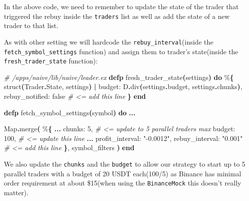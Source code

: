 \documentclass[
  oneside]{book}
\newenvironment{Shaded}{\begin{snugshade}}{\end{snugshade}}
\newcommand{\CommentTok}[1]{\textcolor[rgb]{0.56,0.35,0.01}{\textit{#1}}}
\newcommand{\ConstantTok}[1]{\textcolor[rgb]{0.56,0.35,0.01}{#1}}
\newcommand{\DecValTok}[1]{\textcolor[rgb]{0.00,0.00,0.81}{#1}}
\newcommand{\FunctionTok}[1]{\textcolor[rgb]{0.13,0.29,0.53}{\textbf{#1}}}
\newcommand{\KeywordTok}[1]{\textcolor[rgb]{0.13,0.29,0.53}{\textbf{#1}}}
\newcommand{\NormalTok}[1]{#1}
\newcommand{\OperatorTok}[1]{\textcolor[rgb]{0.81,0.36,0.00}{\textbf{#1}}}
\newcommand{\StringTok}[1]{\textcolor[rgb]{0.31,0.60,0.02}{#1}}
\newcommand{\VariableTok}[1]{\textcolor[rgb]{0.00,0.00,0.00}{#1}}
\begin{document}
In the above code, we need to remember to update the state of the trader that triggered the rebuy inside the \texttt{traders} list as well as add the state of a new trader to that list.

As with other setting we will hardcode the \texttt{rebuy\_interval}(inside the \texttt{fetch\_symbol\_settings} function) and assign them to
trader's state(inside the \texttt{fresh\_trader\_state} function):

\begin{Shaded}
\begin{Highlighting}[]
  \CommentTok{\# /apps/naive/lib/naive/leader.ex}
  \KeywordTok{defp}\NormalTok{ fresh\_trader\_state}\FunctionTok{(}\NormalTok{settings}\FunctionTok{)} \KeywordTok{do}
\NormalTok{    \%}\FunctionTok{\{}
\NormalTok{      struct}\FunctionTok{(}\ConstantTok{Trader}\OperatorTok{.}\ConstantTok{State}\NormalTok{, settings}\FunctionTok{)}
      \OperatorTok{|} \VariableTok{budget:}\NormalTok{ D}\OperatorTok{.}\NormalTok{div}\FunctionTok{(}\NormalTok{settings}\OperatorTok{.}\NormalTok{budget, settings}\OperatorTok{.}\NormalTok{chunks}\FunctionTok{)}\NormalTok{,}
        \VariableTok{rebuy\_notified:} \ConstantTok{false} \CommentTok{\# \textless{}= add this line}
    \FunctionTok{\}}
  \KeywordTok{end}

  \KeywordTok{defp}\NormalTok{ fetch\_symbol\_settings}\FunctionTok{(}\NormalTok{symbol}\FunctionTok{)} \KeywordTok{do}
    \OperatorTok{...}

    \ConstantTok{Map}\OperatorTok{.}\NormalTok{merge}\FunctionTok{(}
\NormalTok{      \%}\FunctionTok{\{}
        \OperatorTok{...}
        \VariableTok{chunks:} \DecValTok{5}\NormalTok{, }\CommentTok{\# \textless{}= update to 5 parallel traders max}
        \VariableTok{budget:} \DecValTok{100}\NormalTok{, }\CommentTok{\# \textless{}= update this line}
        \OperatorTok{...}
        \VariableTok{profit\_interval:} \StringTok{"{-}0.0012"}\NormalTok{,}
        \VariableTok{rebuy\_interval:} \StringTok{"0.001"} \CommentTok{\# \textless{}= add this line}
      \FunctionTok{\}}\NormalTok{,}
\NormalTok{      symbol\_filters}
    \FunctionTok{)}
  \KeywordTok{end}
\end{Highlighting}
\end{Shaded}

We also update the \texttt{chunks} and the \texttt{budget} to allow our strategy to start up to 5 parallel traders with a budget of 20 USDT each(100/5) as Binance has minimal order requirement at about \$15(when using the \texttt{BinanceMock} this doesn't really matter).
\end{document}
